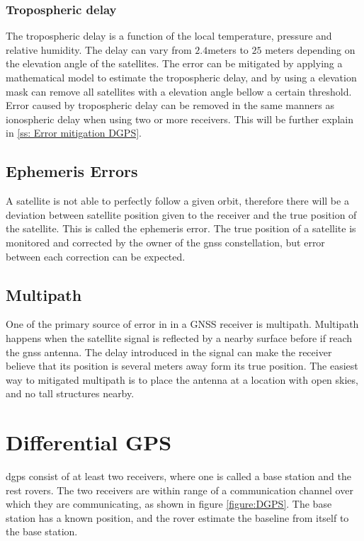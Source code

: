 \subsubsection{Tropospheric delay}
The tropospheric delay is a function of the local temperature, pressure and relative humidity. The delay can vary from $2.4$meters to $25$ meters depending on the elevation angle of the satellites. The error can be mitigated by applying a mathematical model to estimate the tropospheric delay, and by using a elevation mask can remove all satellites with a elevation angle bellow a certain threshold. Error caused by tropospheric delay can be removed in the same manners as ionospheric delay when using two or more receivers. This will be further explain in \ref{ss: Error mitigation DGPS}.

\subsection{Ephemeris Errors}
A satellite is not able to perfectly follow a given orbit, therefore there will be a deviation between satellite position given to the receiver and the true position of the satellite. This is called the ephemeris error. The true position of a satellite is monitored and corrected by the owner of the \gls{gnss} constellation, but error between each correction can be expected.
\subsection{Multipath}
One of the primary source of error in in a GNSS receiver is multipath. Multipath happens when the satellite signal is reflected by a nearby surface before if reach the \gls{gnss} antenna. The delay introduced in the signal can make the receiver believe that its position is several meters away form its true position. The easiest way to mitigated multipath is to place the antenna at a location with open skies, and no tall structures nearby.
\section{Differential GPS}
\acrfull{dgps} consist of at least two receivers, where one is called a base station and the rest rovers. The two receivers are within range of a communication channel over which they are communicating, as shown in figure \ref{figure:DGPS}. The base station has a known position, and the rover estimate the baseline from itself to the base station.

